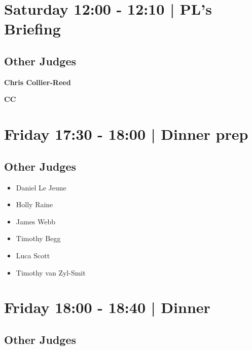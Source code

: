 \documentclass[10pt, A5]{article}
\newcommand{\newtitle}[1]{\begin{center}{\Huge\bfseries #1 }\\ \vspace{5mm}\end{center}}
\newcommand{\newsubtitle}[1]{\begin{center}{\color{grey}\Large\bfseries #1 }\\ \vspace{5mm}\end{center}}
\begin{document}
            \section*{Saturday 12:00
        -
        12:10
        |
         PL's Briefing}
        
                
        \subsection*{Other Judges}
        
            \begin{itemize}
                        \end{itemize}
        

    
	\clearpage

		\newtitle{Chris Collier-Reed}
	\newsubtitle{CC}

            \section*{Friday 17:30
        -
        18:00
        |
         Dinner prep}
        
                
        \subsection*{Other Judges}
        
            \begin{itemize}
                            \item Daniel Le Jeune
                            \item Holly Raine
                            \item James Webb
                            \item Timothy Begg
                            \item Luca Scott
                            \item Timothy van Zyl-Smit
                        \end{itemize}
        

            \section*{Friday 18:00
        -
        18:40
        |
         Dinner }
        
                
        \subsection*{Other Judges}
        
\end{document}
